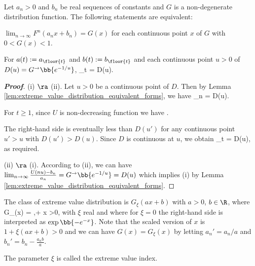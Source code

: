 \begin{lemma}\label{lem:extreme_value_distribution_integer_to_real}
Let $a_n>0$ and $b_n$ be real sequences of constants and $G$ is a non-degenerate distribution function. The following statements are equivalent:
\ben
\item [(i)] $\lim_{n\to\infty} F^n(a_n x + b_n) = G(x)$ for each continuous point $x$ of $G$ with $0<G(x)<1$.
\item [(ii)] For $a(t):= a_{\floor{t}}$ and $b(t) := b_{\floor{t}}$ and each continuous point $u>0$ of $D(u)= G^{\to}\bb{e^{-1/u}}$,
\be
\lim_{t\to\infty}  = D(u).
\ee
\een
\end{lemma}

\begin{proof}[\bf Proof]
(i) $\ra$ (ii). Let $u>0$ be a continuous point of $D$. Then by Lemma \ref{lem:extreme_value_distribution_equivalent_forms}, we have
\be
\lim_{n\to\infty}  = D(u).
\ee

For $t\geq 1$, since $U$ is non-decreasing function we have
\be
{} \leq {} \leq {}.
\ee

The right-hand side is eventually less than $D(u')$ for any continuous point $u'>u$ with $D(u')> D(u)$. Since $D$ is continuous at $u$, we obtain
\be
\lim_{t\to\infty} = D(u),
\ee
as required.

(ii) $\ra$ (i). According to (ii), we can have $\lim_{n\to\infty} \frac{U(nu)-b_n}{a_n} = G^{\to}\bb{e^{-1/u}} = D(u)$ which implies (i) by Lemma \ref{lem:extreme_value_distribution_equivalent_forms}.
\end{proof}


\begin{theorem}\label{thm:extreme_value_theorem}
The class of extreme value distribution is $G_{\xi}(ax+b)$ with $a>0$, $b\in \R$, where
\be
G_{\xi}(x) = \exp{},+ \xi x >0,
\ee
with $\xi$ real and where for $\xi =0$ the right-hand side is interpreted as $\exp\bb{-e^{-x}}$. Note that the scaled version of $x$ is $1+ \xi(ax+b)> 0$ and we can have $G(x) = G_\xi(x)$ by letting $a_n' = a_n/a$ and $b_n' = b_n- \frac{a_n b}{a}$.

The parameter $\xi$ is called the extreme value index.
\end{theorem}

